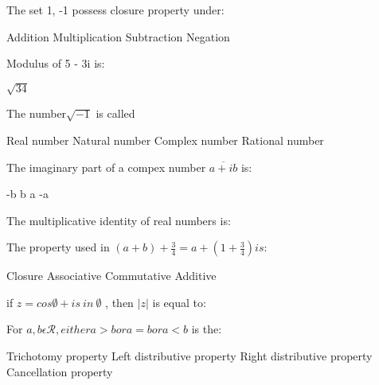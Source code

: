 \documentclass{exam}
\begin{document}
\begin{questions}
The set { 1, -1} possess closure property under:\\
\begin{oneparchoices}
\choice Addition
\choice Multiplication
\choice Subtraction
\choice Negation
\end{oneparchoices}
\question 

Modulus of 5 - 3i is:\\
\begin{oneparchoices}
\choice \(\sqrt{34}\)
\end{oneparchoices}
\question 

The number\( \sqrt{-1}\) is called\\
\begin{oneparchoices}
\choice Real number
\choice Natural number
\choice Complex number
\choice Rational number
\end{oneparchoices}
\question 

The imaginary part of a compex number \(\overline{a +ib}\) is:\\
\begin{oneparchoices}
\choice -b
\choice b
\choice a
\choice -a
\end{oneparchoices}
\question 

The multiplicative identity of real numbers is:\\
\begin{oneparchoices}
\end{oneparchoices}
\question 

The property used in \((a+b)+\frac{3}{4}=a+\left( 1+\frac{3}{4} \right) is:\)\\
\begin{oneparchoices}
\choice Closure
\choice Associative
\choice Commutative
\choice Additive
\end{oneparchoices}
\question 

if \(z = cos\emptyset + is\ in\ \emptyset\) , then \(\left| z \right| \) is equal to:\\
\begin{oneparchoices}
\end{oneparchoices}
\question 

For \( a,b \epsilon\mathscr{R} , either a>b or a=b or a<b \) is the:\\
\begin{oneparchoices}
\choice Trichotomy property
\choice Left distributive property
\choice Right distributive property
\choice Cancellation property
\end{oneparchoices}
\question 


\end{questions}
\end{document}
